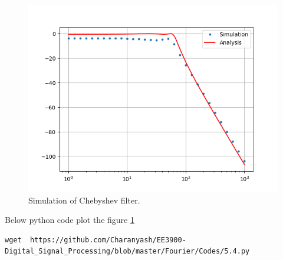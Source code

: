 \documentclass[journal,12pt,twocolumn]{IEEEtran}
\renewcommand\thesection{\arabic{section}}
\begin{document}
\begin{enumerate}[label=\thesection.\arabic*
,ref=\thesection.\theenumi]
\begin{figure}[!ht]
	\end{figure}
	\begin{figure}
	\includegraphics[width=\columnwidth]{Figs/5.4.png}
	\caption{Simulation of Chebyshev filter.}
	\label{fig:sim-cheby}
\end{figure}
	Below python code plot the figure \ref{fig:sim-cheby}
	\begin{lstlisting}
wget  https://github.com/Charanyash/EE3900-Digital_Signal_Processing/blob/master/Fourier/Codes/5.4.py
	\end{lstlisting}
\end{enumerate}
\end{document}
